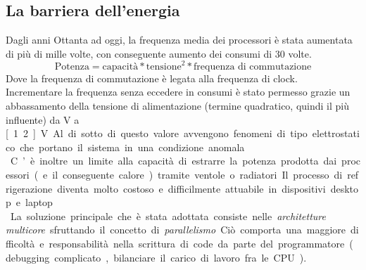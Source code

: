 \subsection{La barriera dell'energia}
Dagli anni Ottanta ad oggi, la frequenza media dei processori è stata aumentata di più di mille volte, con conseguente aumento dei consumi di 30 volte.
\begin{equation*}
\text{Potenza} = \text{capacità}*\text{tensione}^2*\text{frequenza di commutazione}
\end{equation*}
Dove la frequenza di commutazione è legata alla frequenza di clock.\\
Incrementare la frequenza senza eccedere in consumi è stato permesso grazie un abbassamento della tensione di alimentazione (termine quadratico, quindi il più influente) da \unit[5]{V} a \unit[1.2]{V}. Al di sotto di questo valore avvengono fenomeni di tipo elettrostatico che portano il sistema in una condizione anomala.\\
C’è inoltre un limite alla capacità di estrarre la potenza prodotta dai processori (e il conseguente calore) tramite ventole o radiatori. Il processo di refrigerazione diventa molto
costoso e difficilmente attuabile in dispositivi desktop e laptop.\\

La soluzione principale che è stata adottata consiste nelle \textit{architetture multicore} sfruttando il concetto di \textit{parallelismo}. Ciò comporta una maggiore difficoltà e responsabilità nella scrittura di code da parte del programmatore (debugging complicato, bilanciare il carico di lavoro fra le CPU).




